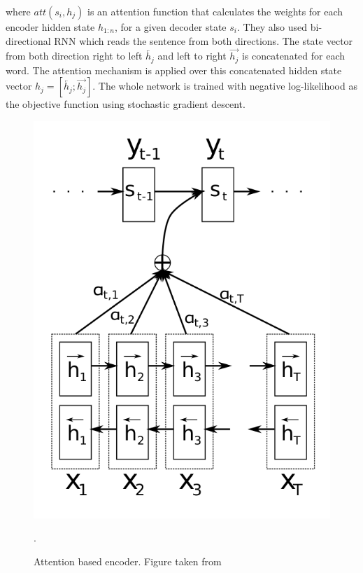 

where $att(s_i, h_j)$ is an attention function that calculates the weights for each encoder hidden state $h_{1:n}$, for a given decoder state $s_i$. They also used bi-directional RNN which reads the sentence from both directions. The state vector from both direction right to left  $\overleftarrow{h_j}$ and left to right $\overrightarrow{h_j}$ is concatenated for each word. The attention mechanism is applied over this concatenated hidden state vector $h_j = [\overleftarrow{h_j};\overrightarrow{h_j}]$. The whole network is trained with negative log-likelihood as the objective function using stochastic gradient descent.


\begin{figure}[ht]
	\centering
	\includegraphics[scale=0.35]{images/attention}
	\caption{Attention based encoder. Figure taken from \cite{bahdanau2014neural}}.
	\label{attention}
\end{figure}


